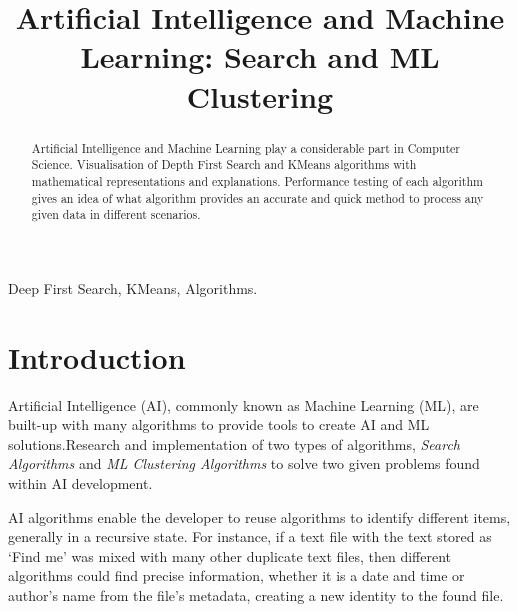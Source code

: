 \documentclass[conference]{IEEEtran}
\begin{document}
	\title{Artificial Intelligence and Machine Learning: Search and ML Clustering}

	\author{
	}

     \maketitle
    
    \thispagestyle{plain}
    \pagestyle{plain}
    
    \begin{abstract}
      Artificial Intelligence and Machine Learning play a considerable part in Computer Science. Visualisation of Depth First Search and KMeans algorithms with mathematical representations and explanations. Performance testing of each algorithm gives an idea of what algorithm provides an accurate and quick method to process any given data in different scenarios.
    \end{abstract}

    \begin{IEEEkeywords}
      Deep First Search, KMeans, Algorithms.
    \end{IEEEkeywords}

    \section{Introduction}
      Artificial Intelligence (AI), commonly known as Machine Learning (ML), are built-up with many algorithms to provide tools to create AI and ML solutions.Research and implementation of two types of algorithms, \textit{Search Algorithms} and \textit{ML Clustering Algorithms} to solve two given problems found within AI development.

      AI algorithms enable the developer to reuse algorithms to identify different items, generally in a recursive state. For instance, if a text file with the text stored as `Find me' was mixed with many other duplicate text files, then different algorithms could find precise information, whether it is a date and time or author's name from the file's metadata, creating a new identity to the found file.
\end{document}
